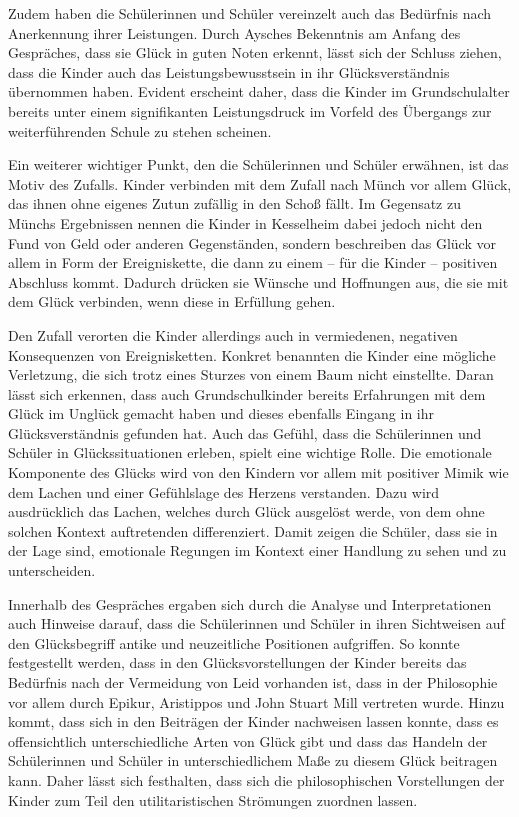 Zudem haben die Schülerinnen und Schüler vereinzelt auch das Bedürfnis nach Anerkennung ihrer Leistungen. 
Durch Aysches Bekenntnis am Anfang des Gespräches, dass sie Glück in guten Noten erkennt,  lässt sich der Schluss ziehen, dass die Kinder auch das Leistungsbewusstsein in ihr Glücksverständnis übernommen haben. 
Evident erscheint daher, dass die Kinder im Grundschulalter bereits unter einem signifikanten Leistungsdruck im Vorfeld des Übergangs zur weiterführenden Schule zu stehen scheinen. 

Ein weiterer wichtiger Punkt, den die Schülerinnen und Schüler erwähnen, ist das Motiv des Zufalls. 
Kinder verbinden mit dem Zufall nach Münch vor allem Glück, \glqq das ihnen ohne eigenes Zutun zufällig in den Schoß fällt.\grqq{} \cite[S.\,62]{JM11}
Im Gegensatz zu Münchs Ergebnissen nennen die Kinder in Kesselheim dabei jedoch nicht den Fund von Geld oder anderen Gegenständen, sondern beschreiben das Glück vor allem in Form der Ereigniskette, die dann zu einem -- für die Kinder -- positiven Abschluss kommt. 
Dadurch drücken sie Wünsche und Hoffnungen aus, die sie mit dem Glück verbinden, wenn diese in Erfüllung gehen. 

Den Zufall verorten die Kinder allerdings auch in vermiedenen, negativen Konsequenzen von Ereignisketten. 
Konkret benannten die Kinder eine mögliche Verletzung, die sich trotz eines Sturzes von einem Baum nicht einstellte. 
Daran lässt sich erkennen, dass auch Grundschulkinder bereits Erfahrungen mit dem Glück im Unglück gemacht haben und dieses ebenfalls Eingang in ihr Glücksverständnis gefunden hat.
Auch das Gefühl, dass die Schülerinnen und Schüler in Glückssituationen erleben, spielt eine wichtige Rolle. 
Die emotionale Komponente des Glücks wird von den Kindern vor allem mit positiver Mimik wie dem Lachen und einer Gefühlslage des Herzens verstanden. 
Dazu wird ausdrücklich das Lachen, welches durch Glück ausgelöst werde, von dem ohne solchen Kontext auftretenden differenziert. 
Damit zeigen die Schüler, dass sie in der Lage sind, emotionale Regungen im Kontext einer Handlung zu sehen und zu unterscheiden. 

Innerhalb des Gespräches ergaben sich durch die Analyse und Interpretationen auch Hinweise darauf, dass die Schülerinnen und Schüler in ihren Sichtweisen auf den Glücksbegriff antike und neuzeitliche Positionen aufgriffen. 
So konnte festgestellt werden, dass in den Glücksvorstellungen der Kinder bereits das Bedürfnis nach der Vermeidung von Leid vorhanden ist, dass in der Philosophie vor allem durch Epikur, Aristippos und John Stuart Mill vertreten wurde. 
Hinzu kommt, dass sich in den Beiträgen der Kinder nachweisen lassen konnte, dass es offensichtlich unterschiedliche Arten von Glück gibt und dass das Handeln der Schülerinnen und Schüler in unterschiedlichem Maße zu diesem Glück beitragen kann. 
Daher lässt sich festhalten, dass sich die philosophischen Vorstellungen der Kinder zum Teil den utilitaristischen Strömungen zuordnen lassen. 

